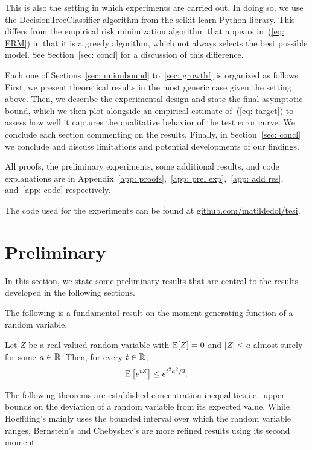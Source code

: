 \documentclass[reqno]{amsart}
\let\oldsection\section
\renewcommand{\section}{\clearpage\thispagestyle{plain}\oldsection}
\begin{document}
This is also the setting in which experiments are carried out. In doing so, we use the DecisionTreeClassifier algorithm from the scikit-learn Python library. This differs from the empirical risk minimization algorithm that appears in~(\ref{eq: ERM}) in that it is a greedy algorithm, which not always selects the best possible model. See Section~\ref{sec: concl} for a discussion of this difference. 

Each one of Sections~\ref{sec: unionbound} to~\ref{sec: growthf} is organized as follows. First, we present theoretical results in the most generic case given the setting above. Then, we describe the experimental design and state the final asymptotic bound, which we then plot alongside an empirical estimate of~(\ref{eq: target}) to assess how well it captures the qualitative behavior of the test error curve. We conclude each section commenting on the results. Finally, in Section~\ref{sec: concl} we conclude and discuss limitations and potential developments of our findings. 


All proofs, the preliminary experiments, some additional results, and code explanations are in Appendix~\ref{app: proofs},~\ref{app: prel exp},~\ref{app: add res}, and~\ref{app: code} respectively. 

The code used for the experiments can be found at \href{https://github.com/matildedol/tesi}{github.com/matildedol/tesi}. 

\newpage

\section{Preliminary}

In this section, we state some preliminary results that are central to the results developed in the following sections. 

The following is a fundamental result on the moment generating function of a random variable. 

\begin{theorem}\label{app: hoeffdinglemma}
  Let $Z$ be a real-valued random variable with $\mathbb{E}[Z]=0$ and $\vert Z\vert\le a$ almost surely for some $a\in\mathbb{R}$. Then, for every $t\in\mathbb{R}$,
  \[
  \mathbb{E}\left[e^{tZ}\right] \le e^{t^2a^2/2}.
  \]
\end{theorem}

The following theorems are established concentration inequalities,i.e.\ upper bounds on the deviation of a random variable from its expected value. While Hoeffding's mainly uses the bounded interval over which the random variable ranges, Bernstein's and Chebyshev's are more refined results using its second moment. 
\end{document}

